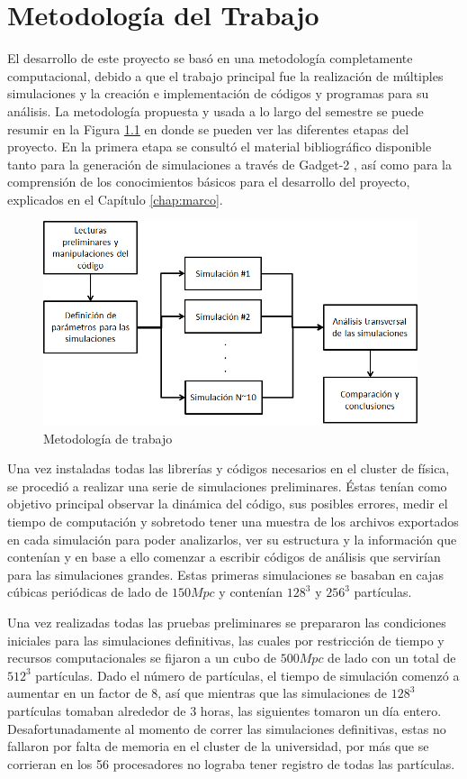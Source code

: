 \chapter{Metodología del Trabajo}
\label{chap:metodologia}
El desarrollo de este proyecto se basó en una metodología completamente computacional, debido a que el trabajo principal fue la realización de múltiples simulaciones y la creación e implementación de códigos y programas para su análisis. La metodología propuesta y usada a lo largo del semestre se puede resumir en la Figura \ref{fig:meto} en donde se pueden ver las diferentes etapas del proyecto. En la primera etapa se consultó el material bibliográfico disponible tanto para la generación de simulaciones a través de Gadget-2 \cite{gadget}, así como para la comprensión de los conocimientos básicos para el desarrollo del proyecto, explicados en el Capítulo \ref{chap:marco}. 

\begin{figure}[H]
	\centering
	\includegraphics[width=11cm]{Metodologia/metodologia.png}
	\caption{Metodología de trabajo}
	\label{fig:meto}
\end{figure}

Una vez instaladas todas las librerías y códigos necesarios en el cluster de física, se procedió a realizar una serie de simulaciones preliminares. Éstas tenían como objetivo principal observar la dinámica del código, sus posibles errores, medir el tiempo de computación y sobretodo tener una muestra de los archivos exportados en cada simulación para poder analizarlos, ver su estructura y la información que contenían y en base a ello comenzar a escribir códigos de análisis que servirían para las simulaciones grandes. Estas primeras simulaciones se basaban en cajas cúbicas periódicas de lado de $150Mpc$ y contenían $128^3$ y $256^3$ partículas.

Una vez realizadas todas las pruebas preliminares se prepararon las condiciones iniciales para las simulaciones definitivas, las cuales por restricción de tiempo y recursos computacionales se fijaron a un cubo de $500Mpc$ de lado con un total de $512^3$ partículas. Dado el número de partículas, el tiempo de simulación comenzó a aumentar en un factor de 8, así que mientras que las simulaciones de $128^3$ partículas tomaban alrededor de 3 horas, las siguientes tomaron un día entero. Desafortunadamente al momento de correr las simulaciones definitivas, estas no fallaron por falta de memoria en el cluster de la universidad, por más que se corrieran en los 56 procesadores no lograba tener registro de todas las partículas. 

